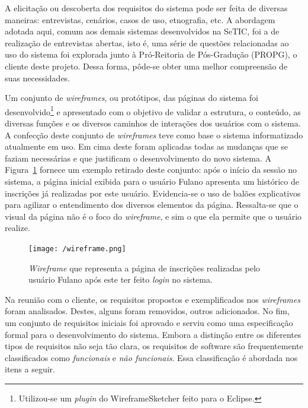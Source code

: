 \documentclass[
  10.5pt,				  %
	openright,			%
	twoside,			  %
  a5paper,
  chapter=TITLE,	%
	section=TITLE,	%
  hyphens,        %
	english,        %
	brazil          %
]{abntex2}
\begin{document}
A elicitação ou descoberta dos requisitos do sistema pode ser feita de diversas maneiras: entrevistas, cenários, casos de uso, etnografia, etc. A abordagem adotada aqui, comum aos demais sistemas desenvolvidos na SeTIC, foi a de realização de entrevistas abertas, isto é, uma série de questões relacionadas ao uso do sistema foi explorada junto à Pró-Reitoria de Pós-Gradução (PROPG), o cliente deste projeto. Dessa forma, pôde-se obter uma melhor compreensão de suas necessidades.

Um conjunto de \emph{wireframes}, ou protótipos, das páginas do sistema foi desenvolvido\footnote{Utilizou-se um \emph{plugin} do WireframeSketcher feito para o Eclipse.} e apresentado com o objetivo de validar a estrutura, o conteúdo, as diversas funções e os diversos caminhos de interações dos usuários com o sistema. A confecção deste conjunto de \emph{wireframes} teve como base o sistema informatizado atualmente em uso. Em cima deste foram aplicadas todas as mudanças que se faziam necessárias e que justificam o desenvolvimento do novo sistema. A Figura~\ref{fig:wireframe} fornece um exemplo retirado deste conjunto: após o início da sessão no sistema, a página inicial exibida para o usuário Fulano apresenta um histórico de inscrições já realizadas por este usuário. Evidencia-se o uso de balões explicativos para agilizar o entendimento dos diversos elementos da página. Ressalta-se que o visual da página não é o foco do \emph{wireframe}, e sim o que ela permite que o usuário realize.

\begin{figure}[!ht]
  \caption{\label{fig:wireframe} \emph{Wireframe} que representa a página de inscrições realizadas pelo usuário Fulano após este ter feito \emph{login} no sistema. }
  \begin{center}
    \texttt{[image: /wireframe.png]}
  \end{center}
\end{figure}

Na reunião com o cliente, os requisitos propostos e exemplificados nos \emph{wireframes} foram analisados. Destes, alguns foram removidos, outros adicionados. No fim, um conjunto de requisitos iniciais
 foi aprovado e serviu como uma especificação formal para o desenvolvimento do sistema. Embora a distinção entre os diferentes tipos de requisitos não seja tão clara, os requisitos de software são frequentemente classificados como \emph{funcionais} e \emph{não funcionais}. Essa classificação é abordada nos itens a seguir.
\end{document}
